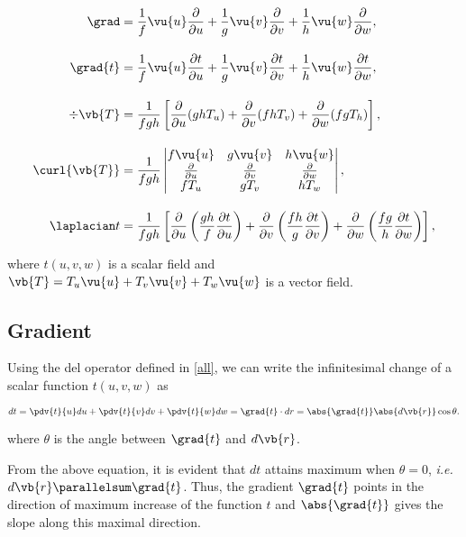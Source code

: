 \documentclass[english,a4paper,12pt]{report}
\begin{document}
\begin{equation} \label{all} 
\begin{aligned}
\grad &= \frac{1}{f}\vu{u}\frac{\partial}{\partial u} + \frac{1}{g}\vu{v}\frac{\partial}{\partial v} + \frac{1}{h}\vu{w}\frac{\partial}{\partial w}, \\[10pt]
\grad{t }&= \frac{1}{f} \vu{u} \frac{\partial t}{\partial u} 
+ \frac{1}{g} \vu{v}\frac{\partial t}{\partial v}  
+ \frac{1}{h} \vu{w}\frac{\partial t}{\partial w} , \\[10pt]
\div{\vb{T}}  &= \frac{1}{fgh} \left[ 
\frac{\partial}{\partial u} (ghT_{u} ) + 
\frac{\partial}{\partial v} (fhT_{v} )+ 
\frac{\partial}{\partial w} (fgT_{h} ) \right], \\[10pt]
\curl{\vb{T} }  &= \frac{1}{fgh} 
\begin{vmatrix} 
f \vu{u} & g \vu{v} & h \vu{w} \\ 
\frac{\partial}{\partial u} & \frac{\partial}{\partial v} & \frac{\partial}{\partial w} \\ 
fT_{u}  & g T_{v}  & h T_{w}  
\end{vmatrix}, \\[10pt]
\laplacian t &= \displaystyle \frac{1}{fgh} \left[
\frac{\partial}{\partial u} \left( \frac{gh}{f} \frac{\partial t}{\partial u} \right) + 
\frac{\partial}{\partial v} \left( \frac{fh}{g} \frac{\partial t}{\partial v} \right) + 
\frac{\partial}{\partial w} \left( \frac{fg}{h} \frac{\partial t}{\partial w} \right)
\right],
\end{aligned}
\end{equation}

where \(t (u,v,w)\) is a scalar field and \(\vb{T} = T_{u}\vu{u} + T_{v}\vu{v} + T_{w}\vu{w} \) is a vector field.  

\subsection{Gradient}
Using the del operator defined in \cref{all}, we can write the infinitesimal change of a scalar function \(t(u,v,w)\) as

\begin{equation}
    dt = \pdv{t}{u}du + \pdv{t}{v}dv + \pdv{t}{w}dw = \grad{t} \cdot dr = \abs{\grad{t} }\abs{d \vb{r} }\cos \theta   . \label{dt} 
\end{equation}

where \(\theta\) is the angle between \(\grad{t}\) and \(d\vb{r}\).
	
From the above equation, it is evident that \(dt\) attains maximum when \(\theta = 0\), \textit{i.e.} \(d\vb{r} \parallelsum \grad{t}\). Thus, the gradient \(\grad{t}\) points in the direction of maximum increase of the function \(t\) and \(\abs{\grad{t}}\) gives the slope along this maximal direction.
\end{document}
